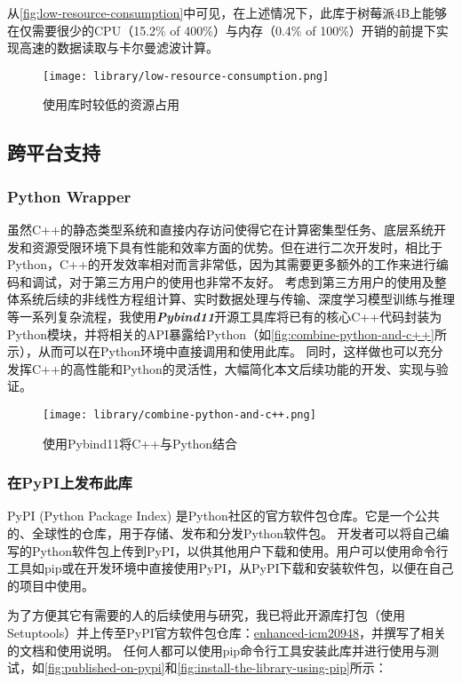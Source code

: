 从\autoref{fig:low-resource-consumption}中可见，在上述情况下，此库于树莓派4B上能够在仅需要很少的CPU（15.2\% of 400\%）与内存（0.4\% of 100\%）开销的前提下实现高速的数据读取与卡尔曼滤波计算。

\begin{figure}[H]
    \centering
    \texttt{[image: library/low-resource-consumption.png]}
    \caption{\label{fig:low-resource-consumption}使用库时较低的资源占用}
\end{figure}

\subsection{跨平台支持}
\subsubsection{Python Wrapper}
虽然C++的静态类型系统和直接内存访问使得它在计算密集型任务、底层系统开发和资源受限环境下具有性能和效率方面的优势。但在进行二次开发时，相比于Python，C++的开发效率相对而言非常低，因为其需要更多额外的工作来进行编码和调试，对于第三方用户的使用也非常不友好。
考虑到第三方用户的使用及整体系统后续的非线性方程组计算、实时数据处理与传输、深度学习模型训练与推理等一系列复杂流程，我使用{\bfseries \itshape Pybind11}开源工具库将已有的核心C++代码封装为Python模块，并将相关的API暴露给Python（如\autoref{fig:combine-python-and-c++}所示），从而可以在Python环境中直接调用和使用此库。
同时，这样做也可以充分发挥C++的高性能和Python的灵活性，大幅简化本文后续功能的开发、实现与验证。

\begin{figure}[H]
    \centering
    \texttt{[image: library/combine-python-and-c++.png]}
    \caption{\label{fig:combine-python-and-c++}使用Pybind11将C++与Python结合}
\end{figure}

\subsubsection{在PyPI上发布此库}
PyPI (Python Package Index) 是Python社区的官方软件包仓库。它是一个公共的、全球性的仓库，用于存储、发布和分发Python软件包。
开发者可以将自己编写的Python软件包上传到PyPI，以供其他用户下载和使用。用户可以使用命令行工具如pip或在开发环境中直接使用PyPI，从PyPI下载和安装软件包，以便在自己的项目中使用。

为了方便其它有需要的人的后续使用与研究，我已将此开源库打包（使用Setuptools）并上传至PyPI官方软件包仓库：\href{https://pypi.org/project/enhanced-icm20948/}{enhanced-icm20948}，并撰写了相关的文档和使用说明。
任何人都可以使用pip命令行工具安装此库并进行使用与测试，如\autoref{fig:published-on-pypi}和\autoref{fig:install-the-library-using-pip}所示：

